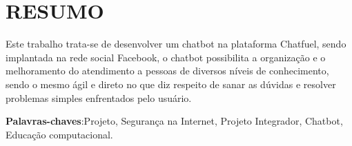 \noindent\chapter*{\uppercase{Resumo}}

\hspace{3} Este trabalho trata-se de desenvolver um chatbot na plataforma Chatfuel, sendo implantada na rede social Facebook, o chatbot possibilita a organização e o melhoramento do atendimento a pessoas de diversos níveis de conhecimento, sendo o mesmo ágil e direto no que diz respeito de sanar as dúvidas e resolver problemas simples enfrentados pelo usuário.

\vspace{1cm}

\noindent \textbf{Palavras-chaves}:Projeto, Segurança na Internet, Projeto Integrador, Chatbot, Educação computacional.